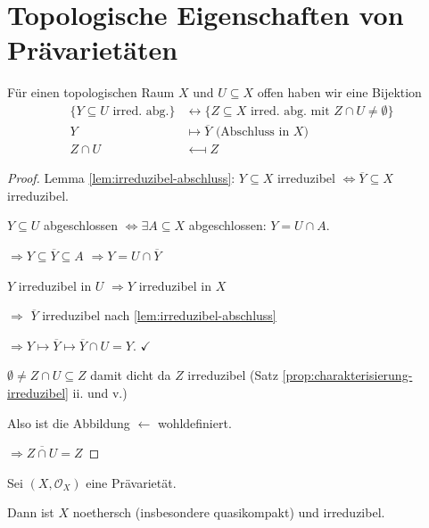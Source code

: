 
\section{Topologische Eigenschaften von Prävarietäten}
\label{sec:topologische-eigenschaften-von-praevarietaeten}
\begin{lem}
  \label{lem:bijektion-irred-teilraeume}
  Für einen topologischen Raum $X$ und $U\subseteq X$ offen haben
  wir eine Bijektion
  \begin{align*}
    \{Y\subseteq U\text{ irred. abg.}\} & \longleftrightarrow\{Z\subseteq X\text{ irred. abg. mit }Z\cap U\neq\emptyset\}\\
    Y & \longmapsto\overline{Y}\text{ (Abschluss in }X)\\
    Z\cap U & \longmapsfrom Z
  \end{align*}
\end{lem}
\begin{proof}
  Lemma \ref{lem:irreduzibel-abschluss}: $Y\subseteq X$ irreduzibel
  $\Leftrightarrow\overline{Y}\subseteq X$ irreduzibel.

  $Y\subseteq U$ abgeschlossen $\Leftrightarrow\exists A\subseteq X$
  abgeschlossen: $Y=U\cap A$.

  $\Rightarrow Y\subseteq\overline{Y}\subseteq A$ $\Rightarrow Y=U\cap\overline{Y}$

  $Y$ irreduzibel in $U$ $\Rightarrow Y$ irreduzibel in $X$

  $\Rightarrow$ $\overline{Y}$ irreduzibel nach \ref{lem:irreduzibel-abschluss}

  $\Rightarrow Y\mapsto\overline{Y}\mapsto\overline{Y}\cap U=Y$. $\checkmark$

  $\emptyset\neq Z\cap U \subseteq Z$
  damit dicht da $Z$ irreduzibel (Satz \ref{prop:charakterisierung-irreduzibel} ii. und v.)

  Also ist die Abbildung $\leftarrow$ wohldefiniert.

  $\Rightarrow\overline{Z\cap U}=Z$ 
\end{proof}
\begin{prop}
  \label{prop:praevarietaeten-noethersch-irreduzibel}
  Sei $(X,\mathcal{O}_{X})$ eine Prävarietät.

  Dann ist $X$ noethersch (insbesondere quasikompakt) und irreduzibel.
\end{prop}

